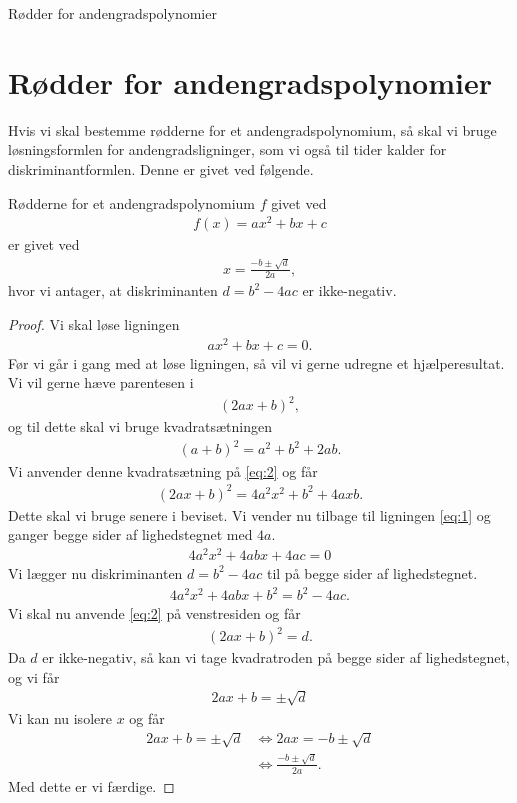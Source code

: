 
\begin{center}
\Huge
Rødder for andengradspolynomier
\end{center}

\section*{Rødder for andengradspolynomier}

Hvis vi skal bestemme rødderne for et andengradspolynomium, så skal vi bruge løsningsformlen for andengradsligninger, som vi også til tider kalder for diskriminantformlen. Denne er givet ved følgende. 
\begin{setn}
	Rødderne for et andengradspolynomium $f$ givet ved
	\begin{align*}
		f(x) = ax^2+bx+c
	\end{align*}
	er givet ved
	\begin{align*}
		x = \frac{-b \pm \sqrt{d}}{2a},
	\end{align*}
	hvor vi antager, at diskriminanten $d = b^2 - 4ac$ er ikke-negativ.
\end{setn}
\begin{proof}
	Vi skal løse ligningen 
	\begin{align}
		\label{eq:1}
		ax^2+bx+c = 0.
	\end{align}
	Før vi går i gang med at løse ligningen, så vil vi gerne udregne et hjælperesultat. Vi vil 		gerne hæve parentesen i 
	\begin{align}
		\label{eq:2}
		(2ax+b)^2,
	\end{align}
	og til dette skal vi bruge kvadratsætningen
	\begin{align*}
		(a+b)^2 = a^2+b^2+2ab.
	\end{align*}
	Vi anvender denne kvadratsætning på \eqref{eq:2} og får
	\begin{align}
		\label{eq:3}
		(2ax + b)^2 = 4a^2x^2+b^2+4axb.
	\end{align}
	Dette skal vi bruge senere i beviset. Vi vender nu tilbage til ligningen \eqref{eq:1} og 			ganger begge sider af lighedstegnet med $4a$.
	\begin{align*}
		4a^2x^2 + 4abx + 4ac = 0
	\end{align*}
	Vi lægger nu diskriminanten $d = b^2 - 4ac$ til på begge sider af lighedstegnet.
	\begin{align*}
		4a^2x^2+4abx + b^2 = b^2 - 4ac.
	\end{align*}
	Vi skal nu anvende \eqref{eq:2} på venstresiden og får
	\begin{align*}
		(2ax + b)^2 = d.
	\end{align*}
	Da $d$ er ikke-negativ, så kan vi tage kvadratroden på begge sider af lighedstegnet, og vi 
	får
	\begin{align*}
		2ax + b = \pm \sqrt{d}
	\end{align*}
	Vi kan nu isolere $x$ og får
	\begin{align*}
		2ax + b = \pm \sqrt{d} &\Leftrightarrow 2ax = -b \pm \sqrt{d} \\
		&\Leftrightarrow \frac{-b \pm \sqrt{d}}{2a}.
	\end{align*}
	Med dette er vi færdige.
\end{proof}
